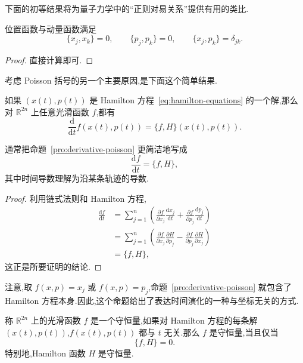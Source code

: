 下面的初等结果将为量子力学中的“正则对易关系”提供有用的类比.

\begin{proposition}\label{pro:canonical-poisson-relations}
位置函数与动量函数满足
\[
  \{x_{j},x_{k}\}=0,\qquad
  \{p_{j},p_{k}\}=0,\qquad
  \{x_{j},p_{k}\}=\delta_{jk}.
\]
\end{proposition}

\begin{proof}
直接计算即可.
\end{proof}

考虑 Poisson 括号的另一个主要原因,是下面这个简单结果.

\begin{proposition}\label{pro:derivative-poisson}
如果 $(x(t),p(t))$ 是 Hamilton 方程~\eqref{eq:hamilton-equations} 的一个解,那么对 $\mathbb{R}^{2n}$ 上任意光滑函数 $f$,都有
\begin{equation}
  \frac{\mathrm{d}}{\mathrm{d}t}f(x(t),p(t))=\{f,H\}(x(t),p(t)).
  \label{eq:derivative-poisson}
\end{equation}
\end{proposition}

通常把命题~\ref{pro:derivative-poisson} 更简洁地写成
\[
  \frac{\mathrm{d}f}{\mathrm{d}t}=\{f,H\},
\]
其中时间导数理解为沿某条轨迹的导数.

\begin{proof}
利用链式法则和 Hamilton 方程,
\begin{align*}
\frac{\mathrm{d}f}{\mathrm{d}t}
 &=\sum_{j=1}^{n}\left(\frac{\partial f}{\partial x_{j}}\frac{\mathrm{d}x_{j}}{\mathrm{d}t}+\frac{\partial f}{\partial p_{j}}\frac{\mathrm{d}p_{j}}{\mathrm{d}t}\right)\\
 &=\sum_{j=1}^{n}\left(\frac{\partial f}{\partial x_{j}}\frac{\partial H}{\partial p_{j}}-\frac{\partial f}{\partial p_{j}}\frac{\partial H}{\partial x_{j}}\right)\\
 &=\{f,H\},
\end{align*}
这正是所要证明的结论.
\end{proof}

注意,取 $f(x,p)=x_{j}$ 或 $f(x,p)=p_{j}$,命题~\ref{pro:derivative-poisson} 就包含了 Hamilton 方程本身.因此,这个命题给出了表达时间演化的一种与坐标无关的方式.

\begin{corollary}\label{cor:poisson-conserved-quantity}
称 $\mathbb{R}^{2n}$ 上的光滑函数 $f$ 是一个守恒量,如果对 Hamilton 方程的每条解 $(x(t),p(t))$,$f(x(t),p(t))$ 都与 $t$ 无关.那么 $f$ 是守恒量,当且仅当
\[
  \{f,H\}=0.
\]
特别地,Hamilton 函数 $H$ 是守恒量.
\end{corollary}

